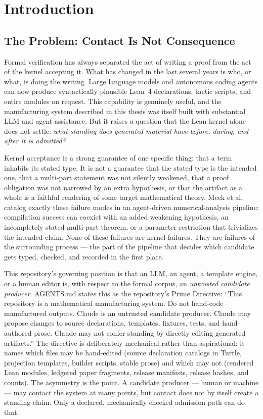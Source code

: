 \chapter{Introduction}
\label{ch:intro}

\section{The Problem: Contact Is Not Consequence}

Formal verification has always separated the act of writing a proof from
the act of the kernel accepting it. What has changed in the last several
years is who, or what, is doing the writing. Large language models and
autonomous coding agents can now produce syntactically plausible Lean~4
declarations, tactic scripts, and entire modules on request. This
capability is genuinely useful, and the manufacturing system described in
this thesis was itself built with substantial LLM and agent assistance.
But it raises a question that the Lean kernel alone does not settle:
\emph{what standing does generated material have before, during, and
after it is admitted?}

Kernel acceptance is a strong guarantee of one specific thing: that a term
inhabits its stated type. It is not a guarantee that the stated type is
the intended one, that a multi-part statement was not silently weakened,
that a proof obligation was not narrowed by an extra hypothesis, or that
the artifact as a whole is a faithful rendering of some target
mathematical theory. Meek et al.~\cite{meek2026formalizing} catalog
exactly these failure modes in an agent-driven numerical-analysis
pipeline: compilation success can coexist with an added weakening
hypothesis, an incompletely stated multi-part theorem, or a parameter
restriction that trivializes the intended claim. None of these failures
are kernel failures. They are failures of the surrounding process --- the
part of the pipeline that decides which candidate gets typed, checked,
and recorded in the first place.

This repository's governing position is that an LLM, an agent, a
template engine, or a human editor is, with respect to the formal
corpus, an \emph{untrusted candidate producer}. AGENTS.md states this as
the repository's Prime Directive: ``This repository is a mathematical
manufacturing system. Do not hand-code manufactured outputs. Claude is an
untrusted candidate producer. Claude may propose changes to source
declarations, templates, fixtures, tests, and hand-authored prose. Claude
may not confer standing by directly editing generated artifacts.'' The
directive is deliberately mechanical rather than aspirational: it names
which files may be hand-edited (source declaration catalogs in Turtle,
projection templates, builder scripts, stable prose) and which may not
(rendered Lean modules, ledgered paper fragments, release manifests,
release hashes, and counts). The asymmetry is the point. A candidate
producer --- human or machine --- may contact the system at many points,
but contact does not by itself create a standing claim. Only a declared,
mechanically checked admission path can do that.

